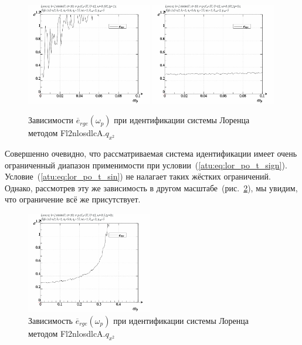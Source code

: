 \begin{figure}[ht!]
  \centerline{
    \includegraphics[width=0.49\textwidth]{p/cha/lor/Fl2nlosdlcA/Fl2nlosdlcA-p_omega_p_e_1.png}
    \hfill
    \includegraphics[width=0.49\textwidth]{p/cha/lor/Fl2nlosdlcA/Fl2nlosdlcA-p_omega_p_e_0.png}
  }
  \caption{Зависимости $\overline{e}_{rge}(\omega_p)$ при идентификации системы Лоренца методом Fl2nlosdlcA.$q_{x^2}$}
  \label{atu:f:lor_Fl2nlosdlcA_e_omega_p}
\end{figure}

Совершенно очевидно, что рассматриваемая система идентификации
имеет очень ограниченный диапазон применимости при условии~(\ref{atu:eq:lor_po_t_sign}).
Условие~(\ref{atu:eq:lor_po_t_sin}) не налагает таких жёстких ограничений.
Однако, рассмотрев эту же зависимость в другом масштабе~(рис.~\ref{atu:f:lor_Fl2nlosdlcA_e_omega_p_wide}),
мы увидим, что ограничение всё же присутствует.

\begin{figure}[ht!]
  \centerline{
    \includegraphics[width=0.49\textwidth]{p/cha/lor/Fl2nlosdlcA/Fl2nlosdlcA-p_omega_p_e_0_wide.png}
  }
  \caption{Зависимость $\overline{e}_{rge}(\omega_p)$ при идентификации системы Лоренца методом Fl2nlosdlcA.$q_{x^2}$}
  \label{atu:f:lor_Fl2nlosdlcA_e_omega_p_wide}
\end{figure}

